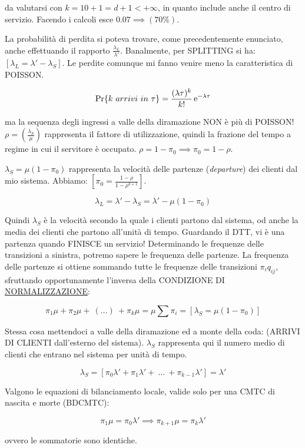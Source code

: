 \begin{itemize}
da valutarsi con $k=10+1=d+1<+\infty$, in quanto include anche il centro di servizio.
Facendo i calcoli esce $0.07 \implies (70\%)$.

La probabilità di perdita si poteva trovare, come precedentemente enunciato, anche effettuando il rapporto $\frac{\lambda_L}{\lambda'}$. Banalmente, per SPLITTING si ha: $[\lambda_L=\lambda'-\lambda_S]$. Le perdite comunque mi fanno venire meno la caratteristica di POISSON.

\[
	\Pr\{k\ arrivi\ in\ \tau\} = \frac{(\lambda\tau)^k}{k!}\mathop{}\!\mathrm{e}^{-\lambda\tau}
\]

ma la sequenza degli ingressi a valle della diramazione NON è più di POISSON! $\rho = (\frac{\lambda_S}{\mu})$ rappresenta il fattore di utilizzazione, quindi la frazione del tempo a regime in cui il servitore è occupato. $\rho=1-\pi_0 \implies \pi_0=1-\rho$.

$\lambda_S=\mu(1-\pi_0)$ rappresenta la velocità delle partenze (\textit{departure}) dei clienti dal mio sistema. Abbiamo: $[\pi_0 = \frac{1-\rho}{1-\rho^{k+1}}]$.

\[
	\lambda_L = \lambda'-\lambda_S = \lambda'-\mu(1-\pi_0)
\]

Quindi $\lambda_S$ è la velocità secondo la quale i clienti partono dal sistema, od anche la media dei clienti che partono all'unità di tempo. Guardando il DTT, vi è una partenza quando FINISCE un servizio! Determinando le frequenze delle transizioni a sinistra, potremo sapere le frequenza delle partenze. La frequenza delle partenze si ottiene sommando tutte le frequenze delle transizioni $\pi_iq_{ij}$, sfruttando opportunamente l'inversa della CONDIZIONE DI \underline{NORMALIZZAZIONE}:

\[
	\pi_1\mu + \pi_2\mu +\ (\dots)\ +\pi_k\mu = \mu\sum{\pi_i} = [\lambda_S = \mu(1-\pi_0)]
\]

Stessa cosa mettendoci a valle della diramazione ed a monte della coda: (ARRIVI DI CLIENTI dall'esterno del sistema). $\lambda_S$ rappresenta qui il numero medio di clienti che entrano nel sistema per unità di tempo.

\[
	\lambda_S = [\pi_0\lambda'+\pi_1\lambda'+\ \dots\ +\pi_{k-1}\lambda'] = \lambda'
\]

Valgono le equazioni di bilanciamento locale, valide solo per una CMTC di nascita e morte (BDCMTC):

\[
	\pi_1\mu = \pi_0\lambda' \implies \pi_{k+1}\mu = \pi_k\lambda'
\]

ovvero le sommatorie sono identiche.


\end{itemize}
